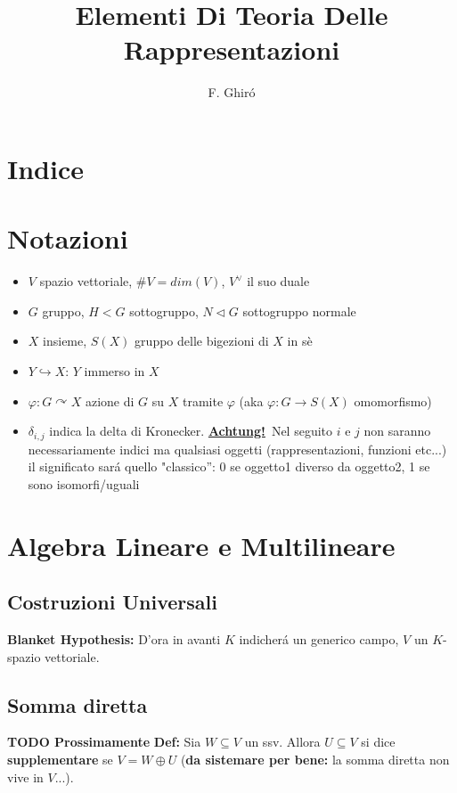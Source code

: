 \documentclass[a4paper,11pt]{article}
\title{Elementi Di Teoria Delle Rappresentazioni}
\author{F. Ghir\'o}
\newcommand{\todo}{{\bf TODO Prossimamente}}
\newcommand{\achtung}{{\bf \underline{Achtung!}}}
\newcommand{\acts}{\curvearrowright}
\newcommand{\normin}{\triangleleft}
\newcommand{\dsum}{\oplus}
\newcommand{\dual}{^{\vee}}
\newcommand{\function}[3]{#1:#2 \rightarrow #3}
\newcommand{\inj}{ \hookrightarrow }
\newcommand{\definition}{\vskip 0.05cm \noindent \textbf{Def:} }
\begin{document}
\maketitle
\newpage
\section*{Indice}
\newpage
\section{Notazioni}
\begin{itemize}

\item $V$ spazio vettoriale, $\#V = dim(V)$, $V\dual$ il suo duale
\item $G$ gruppo, $H < G$ sottogruppo, $N \normin G$ sottogruppo normale
\item $X$ insieme, $S(X)$ gruppo delle bigezioni di $X$ in s\`e
\item $Y \inj X$: $Y$ immerso in $X$
\item $\varphi :G \acts X$ azione di $G$ su $X$ tramite $\varphi$ (aka $\function{\varphi}{G}{S(X)}$ omomorfismo)
\item $\delta_{i,j}$ indica la delta di Kronecker. \achtung \ Nel seguito $i$ e $j$ non saranno necessariamente indici ma qualsiasi oggetti (rappresentazioni, funzioni etc...) il significato sar\'a quello "classico'': 0 se oggetto1 diverso da oggetto2, 1 se sono isomorfi/uguali
\end{itemize}

\newpage
\section{Algebra Lineare e Multilineare}
\subsection*{Costruzioni Universali}
{\bf Blanket Hypothesis:} D'ora in avanti $K$ indicher\'a un generico campo, $V$ un $K$-spazio vettoriale.\\

\subsection{Somma diretta}
\todo
\definition Sia $W\subseteq V$ un ssv. Allora $U\subseteq V$ si dice {\bf supplementare} se $V=W\dsum U$ ({\bf da sistemare per bene:} la somma diretta non vive in $V$...).
\\
\end{document}
